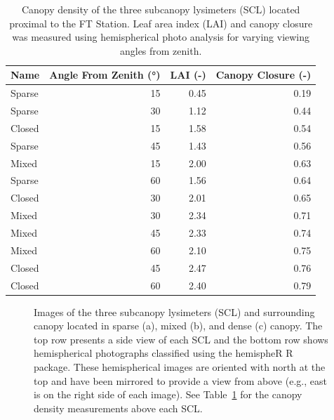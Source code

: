\documentclass[
  letterpaper,
  DIV=11,
  numbers=noendperiod]{scrartcl}
\begin{document}
\begin{longtable}[]{@{}lrrr@{}}

\caption{\label{tbl-scl-lai-cc}Canopy density of the three subcanopy
lysimeters (SCL) located proximal to the FT Station. Leaf area index
(LAI) and canopy closure was measured using hemispherical photo analysis
for varying viewing angles from zenith.}

\tabularnewline

\toprule\noalign{}
Name & Angle From Zenith (°) & LAI (-) & Canopy Closure (-) \\
\midrule\noalign{}
\endhead
\bottomrule\noalign{}
\endlastfoot
Sparse & 15 & 0.45 & 0.19 \\
Sparse & 30 & 1.12 & 0.44 \\
Closed & 15 & 1.58 & 0.54 \\
Sparse & 45 & 1.43 & 0.56 \\
Mixed & 15 & 2.00 & 0.63 \\
Sparse & 60 & 1.56 & 0.64 \\
Closed & 30 & 2.01 & 0.65 \\
Mixed & 30 & 2.34 & 0.71 \\
Mixed & 45 & 2.33 & 0.74 \\
Mixed & 60 & 2.10 & 0.75 \\
Closed & 45 & 2.47 & 0.76 \\
Closed & 60 & 2.40 & 0.79 \\

\end{longtable}

\begin{figure}[H]


\caption{\label{fig-scl-imgs}Images of the three subcanopy lysimeters
(SCL) and surrounding canopy located in sparse (a), mixed (b), and dense
(c) canopy. The top row presents a side view of each SCL and the bottom
row shows hemispherical photographs classified using the hemispheR R
package. These hemispherical images are oriented with north at the top
and have been mirrored to provide a view from above (e.g., east is on
the right side of each image). See Table~\ref{tbl-scl-lai-cc} for the
canopy density measurements above each SCL.}

\end{figure}%
\end{document}

